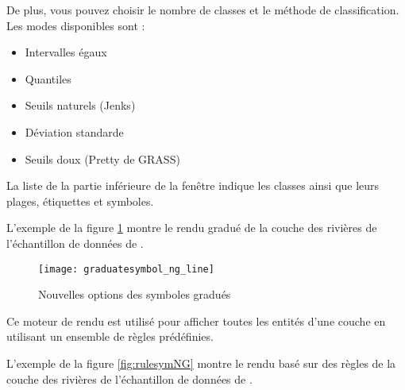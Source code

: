 De plus, vous pouvez choisir le nombre de classes et le méthode de classification. Les modes disponibles sont :

\begin{itemize}
\item Intervalles égaux
\item Quantiles
\item Seuils naturels (Jenks)
\item Déviation standarde
\item  Seuils doux (Pretty de GRASS)
\end{itemize}

La liste de la partie inférieure de la fenêtre indique les classes ainsi que leurs plages, étiquettes et symboles.

L'exemple de la figure \ref{fig:gradsymNG} montre le rendu gradué de la couche des rivières de l'échantillon de données de \qg.

\begin{figure}[ht]
   \centering
   \texttt{[image: graduatesymbol\_ng\_line]}
   \caption{Nouvelles options des symboles gradués \nixcaption}\label{fig:gradsymNG}
\end{figure}


Ce moteur de rendu est utilisé pour afficher toutes les entités d'une couche en utilisant un ensemble de règles prédéfinies.

L'exemple de la figure \ref{fig:rulesymNG} montre le rendu basé sur des règles de la couche des rivières de l'échantillon de données de \qg.

